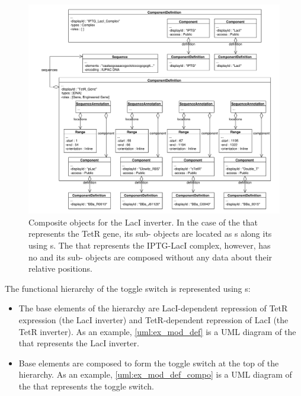 \begin{figure}[ht]
\begin{center}
\includegraphics[width=\textwidth]{example_uml/toggle_2}
\caption[]{Composite  objects for the LacI inverter. In the case of the  that represents the TetR gene, its sub- objects are located as s along its  using s. The  that represents the IPTG-LacI complex, however, has no  and its sub- objects are composed without any data about their relative positions.}
\label{uml:ex_comp_def_compo}
\end{center}
\end{figure}

The functional hierarchy of the toggle switch is represented using
s:
\begin{itemize}
\item The base elements of the hierarchy are LacI-dependent repression of TetR expression (the LacI inverter) and TetR-dependent repression of LacI (the TetR inverter). As an example, \ref{uml:ex_mod_def} is a UML diagram of the  that represents the LacI inverter.
\item Base elements are composed to form the toggle switch at the top of the hierarchy.  As an example, \ref{uml:ex_mod_def_compo} is a UML diagram of the  that represents the toggle switch.
\end{itemize}

